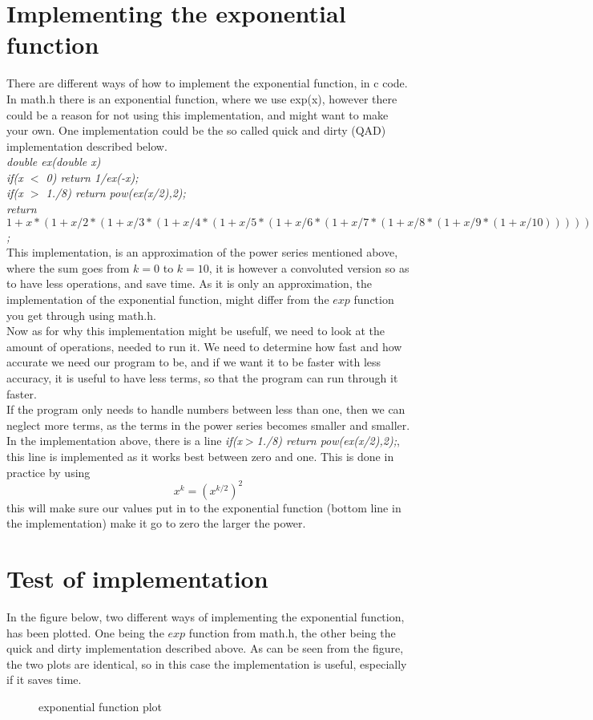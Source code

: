 \documentclass[]{article}
\begin{document}
\section*{Implementing the exponential function}
There are different ways of how to implement the exponential function, in c code. 
In math.h there is an exponential function, where we use exp(x), however there could be a reason for not using this implementation, and might want to make your own.
One implementation could be the so called quick and dirty (QAD) implementation described below.
\\
\textit{double ex(double x){\\
	if(x $<$ 0) return 1/ex(-x);\\
	if(x $>$ 1./8) return pow(ex(x/2),2);\\
	return $1+x*(1+x/2*(1+x/3*(1+x/4*(1+x/5*(1+x/6*(1+x/7*(1+x/8*(1+x/9*(1+x/10)))))))))$;
}
}
\\
This implementation, is an approximation of the power series mentioned above, where the sum goes from $k=0$ to $k=10$, it is however a convoluted version so as to have less operations, and save time. As it is only an approximation, the implementation of the exponential function, might differ from the $exp$ function you get through using math.h.\\
Now as for why this implementation might be usefulf, we need to look at the amount of operations, needed to run it. We need to determine how fast and how accurate we need our program to be, and if we want it to be faster with less accuracy, it is useful to have less terms, so that the program can run through it faster.\\
If the program only needs to handle numbers between less than one, then we can neglect more terms, as the terms in the power series becomes smaller and smaller.
\\
In the implementation above, there is a line \textit{if(x$>$1./8) return pow(ex(x/2),2);}, this line is implemented as it works best between zero and one. This is done in practice by using
\begin{equation*}
	x^k = (x^{k/2})^2
\end{equation*}
this will make sure our values put in to the exponential function (bottom line in the implementation) make it go to zero the larger the power.
\\
\section*{Test of implementation}
In the figure below, two different ways of implementing the exponential function, has been plotted. One being the $exp$ function from math.h, the other being the quick and dirty implementation described above. As can be seen from the figure, the two plots are identical, so in this case the implementation is useful, especially if it saves time.

\begin{figure}[h]
	
	\caption{exponential function plot}
	\label{fig:gpl}
\end{figure}
\end{document}
